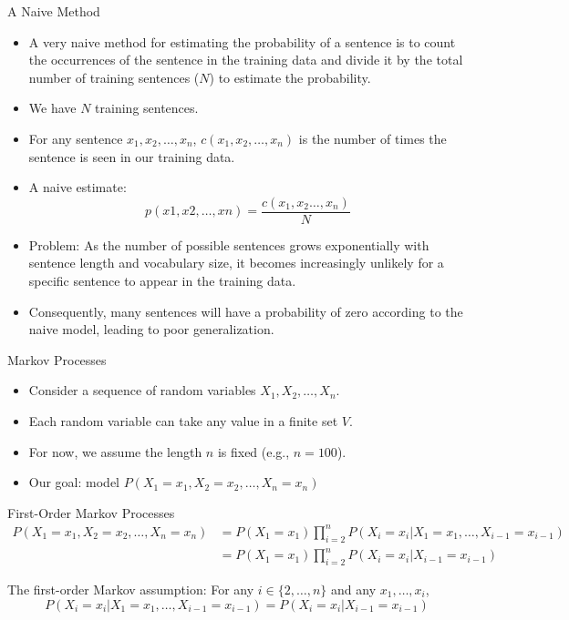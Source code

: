 \documentclass[handout]{beamer}
\begin{document}
\begin{frame}{A Naive Method}
\begin{scriptsize}
\begin{itemize}
\item A very naive method for estimating the probability of a sentence is to count the occurrences of the sentence in the training data and divide it by the total number of training sentences ($N$) to estimate the probability.
\item We have $N$ training sentences.
\item For any sentence $x_1, x_2, \ldots, x_n$, $c(x_1, x_2, \ldots, x_n)$ is the number of times the sentence is seen in our training data.
\item A naive estimate: \begin{displaymath}
                        p(x1,x2,…,xn)=\frac{c(x_1,x_2 \dots,x_n)}{N}
                        \end{displaymath}

                        
\item Problem: As the number of possible sentences grows exponentially with sentence length and vocabulary size, it becomes increasingly unlikely for a specific sentence to appear in the training data. 

\item Consequently, many sentences will have a probability of zero according to the naive model, leading to poor generalization.                      
\end{itemize}
\end{scriptsize}
\end{frame} 

\begin{frame}{Markov Processes}
    \scriptsize
    \begin{itemize}
        \item Consider a sequence of random variables $X_1, X_2, \ldots, X_n$.
        \item Each random variable can take any value in a finite set $V$.
        \item For now, we assume the length $n$ is fixed (e.g., $n = 100$).
        \item Our goal: model $P(X_1 = x_1, X_2 = x_2, \ldots, X_n = x_n)$
    \end{itemize}
\end{frame}

\begin{frame}{First-Order Markov Processes}
    \scriptsize
    \begin{align*}
        P(X_1 = x_1, X_2 = x_2, \ldots, X_n = x_n) &= P(X_1 = x_1) \prod_{i=2}^{n} P(X_i = x_i|X_1 = x_1, \ldots, X_{i-1} = x_{i-1}) \\
        &= P(X_1 = x_1) \prod_{i=2}^{n} P(X_i = x_i|X_{i-1} = x_{i-1})
    \end{align*}
    
    The first-order Markov assumption: For any $i \in \{2, \ldots, n\}$ and any $x_1, \ldots, x_i$,
    \[
    P(X_i = x_i|X_1 = x_1, \ldots, X_{i-1} = x_{i-1}) = P(X_i = x_i|X_{i-1} = x_{i-1})
    \]
\end{frame}
\end{document}
